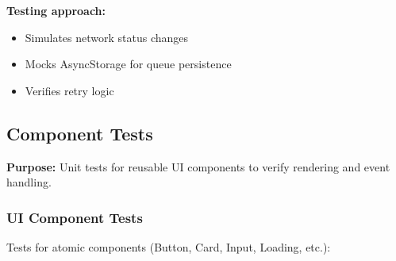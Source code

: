 \textbf{Testing approach:}
\begin{itemize}
    \item Simulates network status changes
    \item Mocks AsyncStorage for queue persistence
    \item Verifies retry logic
\end{itemize}

\subsection{Component Tests}
\label{subsec:component_tests}

\textbf{Purpose:} Unit tests for reusable UI components to verify rendering and event handling.

\subsubsection{UI Component Tests}
\label{subsubsec:ui_component_tests}

Tests for atomic components (Button, Card, Input, Loading, etc.):


